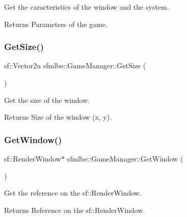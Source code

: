 Get the caracteristics of the window and the system. 

\begin{DoxyReturn}{Returns}
Parameters of the game. 
\end{DoxyReturn}
\mbox{\label{classsfmlbe_1_1_game_manager_aded3ad1e2a432e457f523f70b71d913a}} 
\subsubsection{\texorpdfstring{Get\+Size()}{GetSize()}}
{\footnotesize\ttfamily sf\+::\+Vector2u sfmlbe\+::\+Game\+Manager\+::\+Get\+Size (\begin{DoxyParamCaption}{ }\end{DoxyParamCaption})}



Get the size of the window. 

\begin{DoxyReturn}{Returns}
Size of the window (x, y). 
\end{DoxyReturn}
\mbox{\label{classsfmlbe_1_1_game_manager_af1a92deae211f03579cd4d262c43ca17}} 
\subsubsection{\texorpdfstring{Get\+Window()}{GetWindow()}}
{\footnotesize\ttfamily sf\+::\+Render\+Window$\ast$ sfmlbe\+::\+Game\+Manager\+::\+Get\+Window (\begin{DoxyParamCaption}{ }\end{DoxyParamCaption})\hspace{0.3cm}{\ttfamily [inline]}}



Get the reference on the sf\+::\+Render\+Window. 

\begin{DoxyReturn}{Returns}
Reference on the sf\+::\+Render\+Window. 
\end{DoxyReturn}
\mbox{\label{classsfmlbe_1_1_game_manager_a0fd18d663571814d08d14e6c1ed3191a}} 
